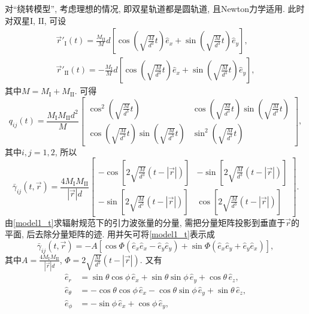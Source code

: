 \documentclass[12pt]{ctexart}
\begin{document}
对``绕转模型'', 考虑理想的情况, 即双星轨道都是圆轨道, 且Newton力学适用. 此时对双星$\text{I}$, $\text{II}$, 可设
\begin{align}
    \vec{r}'_\text{I}(t)=\frac{M_\text{II}}{M}d\left[\cos\left(\sqrt{\frac{ M}{d^3}}t\right)\hat{e}_x+\sin\left(\sqrt{\frac{ M}{d^3}}t\right)\hat{e}_y\right],\\
    \vec{r}'_\text{II}(t)=-\frac{M_\text{I}}{M}d\left[\cos\left(\sqrt{\frac{ M}{d^3}}t\right)\hat{e}_x+\sin\left(\sqrt{\frac{ M}{d^3}}t\right)\hat{e}_y\right],
\end{align}
其中$M=M_\text{I}+M_\text{II}$. 可得
\begin{equation}
    {q}_{ij}(t)=\frac{M_\text{I}M_\text{II}d^2}{M}\begin{bmatrix}
        \cos^2\left(\sqrt{\frac{ M}{d^3}}t\right)&\cos\left(\sqrt{\frac{ M}{d^3}}t\right)\sin\left(\sqrt{\frac{ M}{d^3}}t\right)\\
        \cos\left(\sqrt{\frac{ M}{d^3}}t\right)\sin\left(\sqrt{\frac{ M}{d^3}}t\right)&\sin^2\left(\sqrt{\frac{ M}{d^3}}t\right)
    \end{bmatrix},
\end{equation}
其中$i,j=1,2$, 所以
\begin{equation}
    \bar{\gamma}_{ij}(t,\vec{r})=\frac{4 M_\text{I}M_\text{II}}{\left\lvert\vec{r}\right\rvert d}\begin{bmatrix}
        -\cos\left[2\sqrt{\frac{ M}{d^3}}\left(t-\left\lvert\vec{r}\right\rvert\right)\right]&-\sin\left[2\sqrt{\frac{ M}{d^3}}\left(t-\left\lvert\vec{r}\right\rvert\right)\right]\\
        -\sin\left[2\sqrt{\frac{ M}{d^3}}\left(t-\left\lvert\vec{r}\right\rvert\right)\right]&\cos\left[2\sqrt{\frac{ M}{d^3}}\left(t-\left\lvert\vec{r}\right\rvert\right)\right]
    \end{bmatrix}.\label{model1_t}
\end{equation}
由\eqref{model1_t}求辐射规范下的引力波张量的分量, 需把分量矩阵投影到垂直于$\vec{r}$的平面, 后去除分量矩阵的迹\cite{Sathyaprakash2009}. 用并矢可将\eqref{model1_t}表示成
\begin{equation}
    \bar{\gamma}_{ij}(t,\vec{r})=-A\left[
        \cos\Phi\left(\hat{e}_x\hat{e}_x-\hat{e}_y\hat{e}_y\right)+\sin\Phi\left(\hat{e}_x\hat{e}_y+\hat{e}_y\hat{e}_x\right)
    \right],
\end{equation}
其中$A=\frac{4 M_\text{I}M_\text{II}}{\left\lvert\vec{r}\right\rvert d}$, $\Phi=2\sqrt{\frac{ M}{d^3}}\left(t-\left\lvert\vec{r}\right\rvert\right)$. 又有
\begin{align}
    \hat{e}_r&=\sin\theta\cos\phi\,\hat{e}_x+\sin\theta\sin\phi\,\hat{e}_y+\cos\theta\,\hat{e}_z,\label{e_r}\\
    \hat{e}_\theta&=-\cos\theta\cos\phi\,\hat{e}_x-\cos\theta\sin\phi\,\hat{e}_y+\sin\theta\,\hat{e}_z,\label{e_theta}\\
    \hat{e}_\phi&=-\sin\phi\,\hat{e}_x+\cos\phi\,\hat{e}_y,\label{e_phi}
\end{align}
\end{document}
